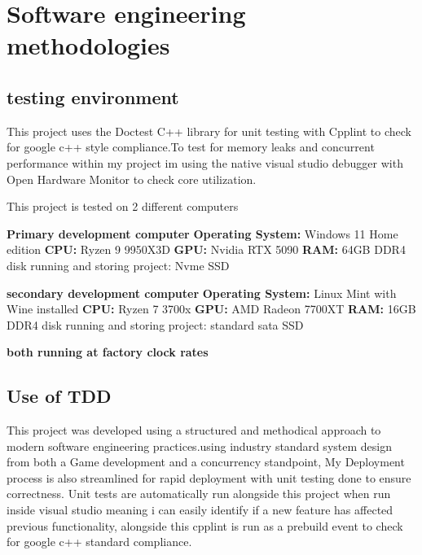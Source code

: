 \documentclass[]{final_report}
\begin{document}
\chapter{Software engineering methodologies}
\section{testing environment}
This project uses the Doctest C++ library for unit testing with Cpplint to check for google c++ style compliance.To test for memory leaks and concurrent performance within my project im using the native visual studio debugger with Open Hardware Monitor to check core utilization.

This project is tested on 2 different computers

\textbf{Primary development computer } \newline
\textbf{Operating System:} Windows 11 Home edition \newline
\textbf{CPU:} Ryzen 9 9950X3D \newline
\textbf{GPU:} Nvidia RTX 5090 \newline
\textbf{RAM:} 64GB DDR4 \newline
disk running and storing project: Nvme SSD \newline

\textbf{secondary development computer} \newline
\textbf{Operating System:} Linux Mint with Wine installed \newline
\textbf{CPU:} Ryzen 7 3700x \newline
\textbf{GPU:} AMD Radeon 7700XT \newline
\textbf{RAM:} 16GB DDR4 \newline
disk running and storing project: standard sata SSD \newline

\textbf{both running at factory clock rates} \newline

\section{Use of TDD}
This project was developed using a structured and methodical approach to modern software engineering practices.using industry standard system design from both a Game development and a concurrency standpoint, My Deployment process is also streamlined for rapid deployment with unit testing done to ensure correctness. Unit tests are automatically run alongside this project when run inside visual studio meaning i can easily identify if a new feature has affected previous functionality, alongside this cpplint is run as a prebuild event to check for google c++ standard compliance.
\end{document}
